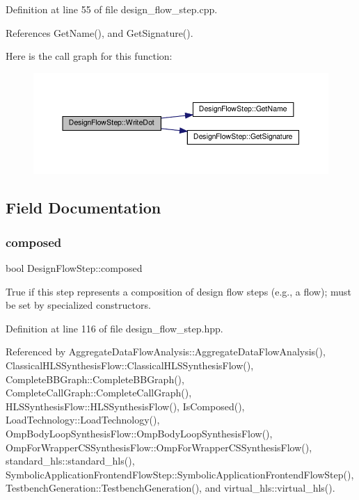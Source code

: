 Definition at line 55 of file design\+\_\+flow\+\_\+step.\+cpp.



References Get\+Name(), and Get\+Signature().

Here is the call graph for this function\+:
\nopagebreak
\begin{figure}[H]
\begin{center}
\leavevmode
\includegraphics[width=350pt]{d3/da9/classDesignFlowStep_a1562bb503d9b9f2a2a059041d79043c6_cgraph}
\end{center}
\end{figure}


\subsection{Field Documentation}
\mbox{\label{classDesignFlowStep_a523e6c76331990290e451a16bcab13f3}} 
\subsubsection{\texorpdfstring{composed}{composed}}
{\footnotesize\ttfamily bool Design\+Flow\+Step\+::composed\hspace{0.3cm}{\ttfamily [protected]}}



True if this step represents a composition of design flow steps (e.\+g., a flow); must be set by specialized constructors. 



Definition at line 116 of file design\+\_\+flow\+\_\+step.\+hpp.



Referenced by Aggregate\+Data\+Flow\+Analysis\+::\+Aggregate\+Data\+Flow\+Analysis(), Classical\+H\+L\+S\+Synthesis\+Flow\+::\+Classical\+H\+L\+S\+Synthesis\+Flow(), Complete\+B\+B\+Graph\+::\+Complete\+B\+B\+Graph(), Complete\+Call\+Graph\+::\+Complete\+Call\+Graph(), H\+L\+S\+Synthesis\+Flow\+::\+H\+L\+S\+Synthesis\+Flow(), Is\+Composed(), Load\+Technology\+::\+Load\+Technology(), Omp\+Body\+Loop\+Synthesis\+Flow\+::\+Omp\+Body\+Loop\+Synthesis\+Flow(), Omp\+For\+Wrapper\+C\+S\+Synthesis\+Flow\+::\+Omp\+For\+Wrapper\+C\+S\+Synthesis\+Flow(), standard\+\_\+hls\+::standard\+\_\+hls(), Symbolic\+Application\+Frontend\+Flow\+Step\+::\+Symbolic\+Application\+Frontend\+Flow\+Step(), Testbench\+Generation\+::\+Testbench\+Generation(), and virtual\+\_\+hls\+::virtual\+\_\+hls().

